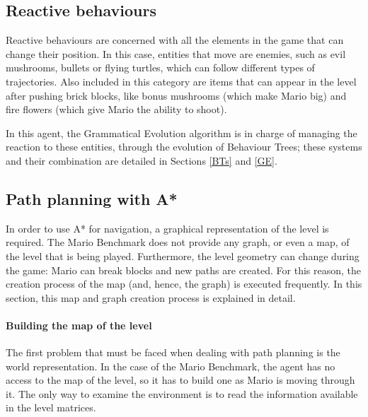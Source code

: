 \documentclass[conference]{IEEEtran}
\begin{document}
\subsection{Reactive behaviours}

Reactive behaviours are concerned with all the elements in the
game that can change their position. In this case, entities that move are enemies, 
such as evil mushrooms, bullets or flying turtles, which can follow different 
types of trajectories. Also included in this category are
items that can appear in the level after pushing brick blocks, like bonus mushrooms
(which make Mario big) and fire flowers (which give Mario the ability to shoot).

In this agent, the Grammatical Evolution algorithm is in charge of managing the
reaction to these entities, through the evolution of Behaviour Trees; these
systems and their combination are detailed in Sections \ref{BTs} and \ref{GE}.


\subsection{Path planning with A*}

In order to use A* for navigation, a graphical representation of the level is
required. The Mario Benchmark does not provide any graph, or
even a map, of the level that is being played. Furthermore, the level geometry
can change during the game: 
Mario can break blocks and new paths are created. For this reason, 
the creation process of the map (and, hence, the graph) is executed frequently.
In this section, this map and graph creation process is explained in detail.

\paragraph{Building the map of the level}

The first problem that must be faced when dealing with path planning is 
the world representation. In the case of the Mario Benchmark, the agent has
no access to the map of the level, so it has to build one as Mario
is moving through it. The only way to examine the 
environment is to read the information available in the level matrices.
\end{document}
